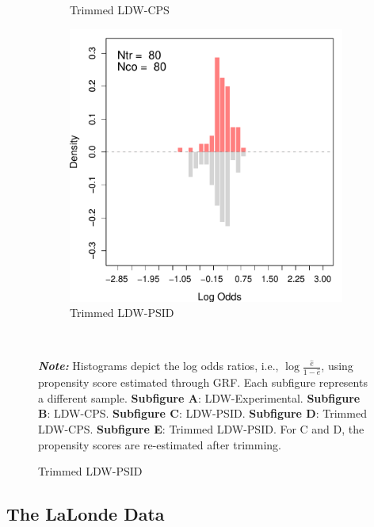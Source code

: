 \documentclass[letterpaper,12pt,leqno]{article}
\begin{document}
\begin{figure}[!th]
\begin{minipage}[c]{.65\textwidth}
\begin{subfigure}{0.45\linewidth}
            \caption{Trimmed LDW-CPS}
        \end{subfigure}
        \begin{subfigure}{0.45\linewidth}
            \includegraphics[width=\linewidth]{odds_ldw_psid_trim.pdf}
            \caption{Trimmed LDW-PSID}
        \end{subfigure}
    \end{minipage}%
    \\\raggedright
     {\footnotesize\textbf{\textit{Note:}} Histograms depict the log odds ratios, i.e., $\log\frac{\hat{e}}{1-\hat{e}}$, using propensity score estimated through GRF. Each subfigure represents a different sample. \textbf{Subfigure A}: LDW-Experimental. \textbf{Subfigure B}: LDW-CPS. \textbf{Subfigure C}: LDW-PSID. \textbf{Subfigure D}: Trimmed LDW-CPS. \textbf{Subfigure E}: Trimmed LDW-PSID. For C and D, the propensity scores are re-estimated after trimming.}
\end{figure}



\subsection{The LaLonde Data}
\end{document}
